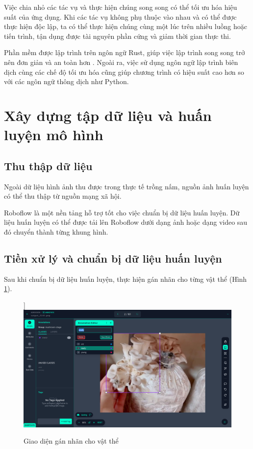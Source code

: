 Việc chia nhỏ các tác vụ và thực hiện chúng song song có thể tối ưu hóa hiệu suất của ứng dụng. Khi các tác vụ không phụ thuộc vào nhau và có thể được thực hiện độc lập, ta có thể thực hiện chúng cùng một lúc trên nhiều luồng hoặc tiến trình, tận dụng được tài nguyên phần cứng và giảm thời gian thực thi.

Phần mềm được lập trình trên ngôn ngữ Rust, giúp việc lập trình song song trở nên đơn giản và an toàn hơn \cite{rust2022}. Ngoài ra, việc sử dụng ngôn ngữ lập trình biên dịch cùng các chế độ tối ưu hóa cũng giúp chương trình có hiệu suất cao hơn so với các ngôn ngữ thông dịch như Python.

\section{Xây dựng tập dữ liệu và huấn luyện mô hình}

\subsection{Thu thập dữ liệu}

Ngoài dữ liệu hình ảnh thu được trong thực tế trồng nấm, nguồn ảnh huấn luyện có thể thu thập từ nguồn mạng xã hội.

Roboflow là một nền tảng hỗ trợ tốt cho việc chuẩn bị dữ liệu huấn luyện. Dữ liệu huấn luyện có thể được tải lên Roboflow dưới dạng ảnh hoặc dạng video sau đó chuyển thành từng khung hình.


\subsection{Tiền xử lý và chuẩn bị dữ liệu huấn luyện}

Sau khi chuẩn bị dữ liệu huấn luyện, thực hiện gán nhãn cho từng vật thể (Hình \ref{fig:labeling-interface}).

\begin{figure}[H]]
    \centering
    \includegraphics[width=0.85\linewidth]{images/image-labeling.png}
    \caption{Giao diện gán nhãn cho vật thể}
    \label{fig:labeling-interface}
\end{figure}

